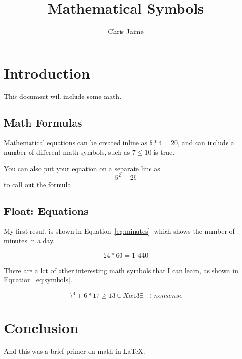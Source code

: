 \documentclass{article}
\title{Mathematical Symbols}
\author{Chris Jaime}
\date{}
\begin{document}
\maketitle

\section{Introduction}
This document will include some math.

\subsection{Math Formulas}
Mathematical equations can be created inline as $5*4=20$, and can include a number
of different math symbols, such as $7 \leq 10$ is true.

You can also put your equation on a separate line as \[5^2=25\] to call out the formula.

\subsection{Float: Equations}

My first result is shown in Equation~\ref{eq:minutes}, which shows the number of minutes
in a day.

\begin{equation}
24*60=1,440
\label{eq:minutes}
\end{equation}

There are a lot of other interesting math symbols that I can learn, as shown in
Equation~\ref{eq:symbols}.

\begin{equation}
7^4+6*17 \geq 13 \cup X \alpha 13 \exists \rightarrow nonsense
\label{eq:symbols}
\end{equation}

\section{Conclusion}
And this was a brief primer on math in \LaTeX.
\end{document}

